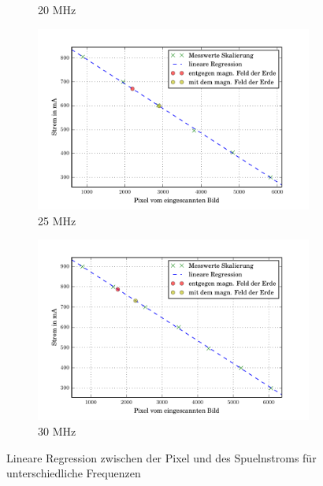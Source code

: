 \begin{figure}
\begin{subfigure}[b]{0.49\textwidth}
     \caption{20 MHz}
     \label{fig:20Reg}
  \end{subfigure}
  \begin{subfigure}[b]{0.49\textwidth}
     \includegraphics[width=\textwidth]{picture/25MHz.pdf}
     \caption{25 MHz}
     \label{fig:20Reg}
  \end{subfigure}
  \begin{subfigure}[b]{0.49\textwidth}
     \includegraphics[width=\textwidth]{picture/30MHz.pdf}
     \caption{30 MHz}
     \label{fig:30Reg}
  \end{subfigure}
  \caption{Lineare Regression zwischen der Pixel und des Spuelnstroms für unterschiedliche Frequenzen}
  \label{fig:Reg}
\end{figure}
